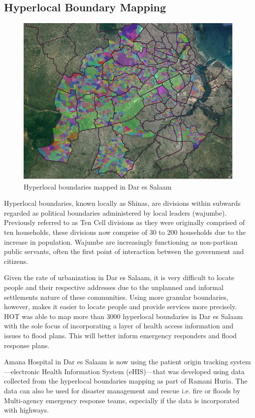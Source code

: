\documentclass[a4paper,12pt,twoside]{article}
\begin{document}
\newpage
\subsection{Hyperlocal Boundary Mapping}
\begin{figure}[h]
    \centering
    \includegraphics[width=.8\textwidth]{images/shinaexample.jpeg}
    \caption{Hyperlocal boundaries mapped in Dar es Salaam}
\end{figure}

\begin{multicols}{2}
Hyperlocal boundaries, known locally as Shinas, are divisions within subwards regarded as political boundaries administered by local leaders (wajumbe). Previously referred to as Ten Cell divisions as they were originally comprised of ten households, these divisions now comprise of 30 to 200 households due to the increase in population. Wajumbe are increasingly functioning as non-partisan public servants, often the first point of interaction between the government and citizens.

Given the rate of urbanization in Dar es Salaam, it is very difficult to locate people and their respective addresses due to the unplanned and informal settlements nature of these communities. Using more granular boundaries, however, makes it easier to locate people and provide services more precisely. HOT was able to map more than 3000 hyperlocal boundaries in Dar es Salaam with the sole focus of incorporating a layer of health access information and issues to flood plans. This will better inform emergency responders and flood response plans. 

Amana Hospital in Dar es Salaam is now using the patient origin tracking system---electronic Health Information System (eHIS)---that was developed using data collected from the hyperlocal boundaries mapping as part of Ramani Huria. The data can also be used for disaster management and rescue i.e. fire or floods by Multi-agency emergency response teams, especially if the data is incorporated with highways.
\end{multicols}
\end{document}
